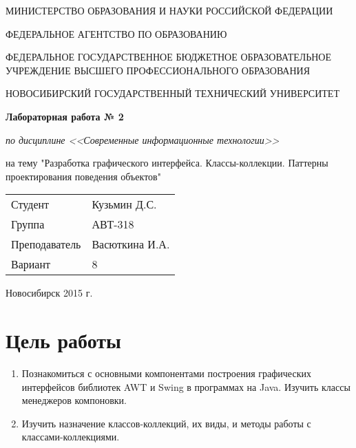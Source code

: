 \documentclass{article}
\begin{document}
\begin{center}
МИНИСТЕРСТВО ОБРАЗОВАНИЯ И НАУКИ РОССИЙСКОЙ ФЕДЕРАЦИИ
\vspace{20pt}

ФЕДЕРАЛЬНОЕ  АГЕНТСТВО  ПО  ОБРАЗОВАНИЮ

ФЕДЕРАЛЬНОЕ  ГОСУДАРСТВЕННОЕ  БЮДЖЕТНОЕ ОБРАЗОВАТЕЛЬНОЕ  УЧРЕЖДЕНИЕ 
ВЫСШЕГО  ПРОФЕССИОНАЛЬНОГО  ОБРАЗОВАНИЯ

НОВОСИБИРСКИЙ  ГОСУДАРСТВЕННЫЙ  ТЕХНИЧЕСКИЙ  УНИВЕРСИТЕТ

\vspace{\fill}
{\bfseries \Large Лабораторная работа № 2}

{\itshape по дисциплине <<Современные информационные технологии>>}

на тему "Разработка графического интерфейса. 
Классы-коллекции.
Паттерны проектирования поведения объектов"
\vspace{\fill}

\begin{flushleft}
\begin{tabular}{ l l }
Студент & Кузьмин Д.С. \\
Группа & АВТ-318 \\
Преподаватель & Васюткина И.А. \\
Вариант & 8 \\
\end{tabular}
\end{flushleft}

\vspace{\fill}
Новосибирск 2015 г.
\end{center}
\pagebreak



\section*{Цель работы}

\begin{enumerate}
\item Познакомиться с основными компонентами построения графических интерфейсов библиотек AWT и Swing в программах на Java. Изучить классы менеджеров компоновки.
\item Изучить назначение классов-коллекций, их виды, и методы работы с классами-коллекциями.
\end{enumerate}
\end{document}
